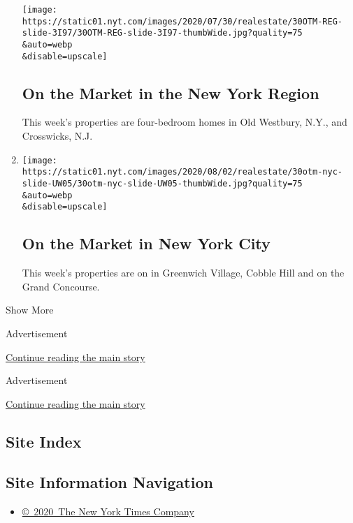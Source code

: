 \begin{enumerate}
  \texttt{[image: https://static01.nyt.com/images/2020/07/30/realestate/30OTM-REG-slide-3I97/30OTM-REG-slide-3I97-thumbWide.jpg?quality=75\\\&auto=webp\\\&disable=upscale]}

  \hypertarget{on-the-market-in-the-new-york-region}{%
  \subsection{On the Market in the New York
  Region}\label{on-the-market-in-the-new-york-region}}

  This week's properties are four-bedroom homes in Old Westbury, N.Y.,
  and Crosswicks, N.J.
\item
  \href{/slideshow/2020/07/30/realestate/on-the-market-in-new-york-city.html}{}

  \texttt{[image: https://static01.nyt.com/images/2020/08/02/realestate/30otm-nyc-slide-UW05/30otm-nyc-slide-UW05-thumbWide.jpg?quality=75\\\&auto=webp\\\&disable=upscale]}

  \hypertarget{on-the-market-in-new-york-city}{%
  \subsection{On the Market in New York
  City}\label{on-the-market-in-new-york-city}}

  This week's properties are on in Greenwich Village, Cobble Hill and on
  the Grand Concourse.
\end{enumerate}

Show More

Advertisement

\protect\hyperlink{after-mid3}{Continue reading the main story}

Advertisement

\protect\hyperlink{after-mktg}{Continue reading the main story}

\hypertarget{site-index}{%
\subsection{Site Index}\label{site-index}}

\hypertarget{site-information-navigation}{%
\subsection{Site Information
Navigation}\label{site-information-navigation}}

\begin{itemize}
\tightlist
\item
  \href{https://help.nytimes.com/hc/en-us/articles/115014792127-Copyright-notice}{©~2020~The
  New York Times Company}
\end{itemize}


